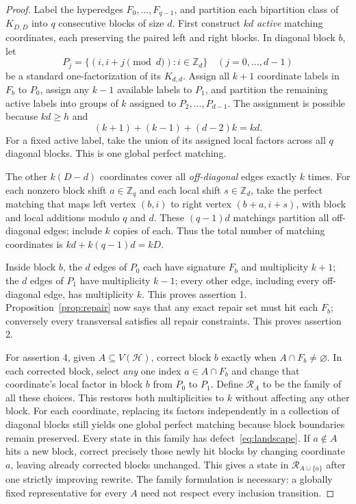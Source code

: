 \documentclass[10pt]{article}
\newcommand{\Hh}{\mathcal H}
\begin{document}
\begin{proof}
Label the hyperedges $F_0,\ldots,F_{q-1}$, and partition each bipartition class of $K_{D,D}$ into $q$ consecutive blocks of size $d$. First construct $kd$ \emph{active} matching coordinates, each preserving the paired left and right blocks. In diagonal block $b$, let
\[P_j=\{(i,i+j\pmod d):i\in\mathbb Z_d\}\quad(j=0,\ldots,d-1)\]
be a standard one-factorization of its $K_{d,d}$. Assign all $k+1$ coordinate labels in $F_b$ to $P_0$, assign any $k-1$ available labels to $P_1$, and partition the remaining active labels into groups of $k$ assigned to $P_2,\ldots,P_{d-1}$. The assignment is possible because $kd\ge h$ and
\[(k+1)+(k-1)+(d-2)k=kd.\]
For a fixed active label, take the union of its assigned local factors across all $q$ diagonal blocks. This is one global perfect matching.

The other $k(D-d)$ coordinates cover all \emph{off-diagonal} edges exactly $k$ times. For each nonzero block shift $a\in\mathbb Z_q$ and each local shift $s\in\mathbb Z_d$, take the perfect matching that maps left vertex $(b,i)$ to right vertex $(b+a,i+s)$, with block and local additions modulo $q$ and $d$. These $(q-1)d$ matchings partition all off-diagonal edges; include $k$ copies of each. Thus the total number of matching coordinates is $kd+k(q-1)d=kD$.

Inside block $b$, the $d$ edges of $P_0$ each have signature $F_b$ and multiplicity $k+1$; the $d$ edges of $P_1$ have multiplicity $k-1$; every other edge, including every off-diagonal edge, has multiplicity $k$. This proves assertion 1. Proposition~\ref{prop:repair} now says that any exact repair set must hit each $F_b$; conversely every transversal satisfies all repair constraints. This proves assertion 2.

For assertion 4, given $A\subseteq V(\Hh)$, correct block $b$ exactly when $A\cap F_b\neq\varnothing$. In each corrected block, select \emph{any} one index $a\in A\cap F_b$ and change that coordinate's local factor in block $b$ from $P_0$ to $P_1$. Define $\mathcal R_A$ to be the family of all these choices. This restores both multiplicities to $k$ without affecting any other block. For each coordinate, replacing its factors independently in a collection of diagonal blocks still yields one global perfect matching because block boundaries remain preserved. Every state in this family has defect~\eqref{eq:landscape}. If $a\notin A$ hits a new block, correct precisely those newly hit blocks by changing coordinate $a$, leaving already corrected blocks unchanged. This gives a state in $\mathcal R_{A\cup\{a\}}$ after one strictly improving rewrite. The family formulation is necessary: a globally fixed representative for every $A$ need not respect every inclusion transition.


\end{proof}
\end{document}
